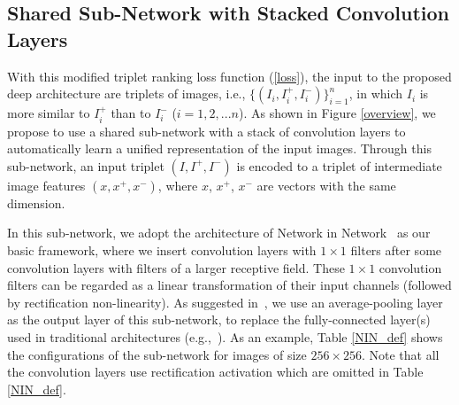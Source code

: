 \documentclass[10pt,twocolumn,letterpaper]{article}
\begin{document}
\subsection{Shared Sub-Network with Stacked Convolution Layers}
With this modified triplet ranking loss function (\ref{loss}), the input to the
proposed deep architecture are triplets of images, i.e.,
$\{(I_i,I_i^+,I_i^-)\}_{i=1}^{n}$, in which $I_i$ is more similar
to $I_i^+$ than to $I_i^-$ ($i=1,2,...n$). As shown in Figure
\ref{overview}, we propose to use a shared sub-network with a stack
of convolution layers to automatically learn a unified
representation of the input images. Through this sub-network, an
input triplet $(I,I^+,I^-)$ is encoded to a triplet of intermediate
image features $(x,x^+,x^-)$, where $x$, $x^+$,
$x^-$ are vectors with the same dimension.

In this sub-network, we adopt the architecture of Network in Network~\cite{NIN} as our
basic framework, where we insert convolution layers with $1\times 1$
filters after some convolution layers with filters of a larger
receptive field. These $1\times 1$ convolution filters can be
regarded as a linear transformation of their input channels
(followed by rectification non-linearity). As suggested in~\cite{NIN}, we use an average-pooling layer as the output layer of this sub-network, to replace the fully-connected layer(s) used in traditional architectures (e.g.,~\cite{AlexNet}). As an example, Table \ref{NIN_def} shows the configurations of the sub-network for images of size $256 \times 256$.
Note that all the convolution layers use rectification activation which are omitted in Table \ref{NIN_def}.
\end{document}
